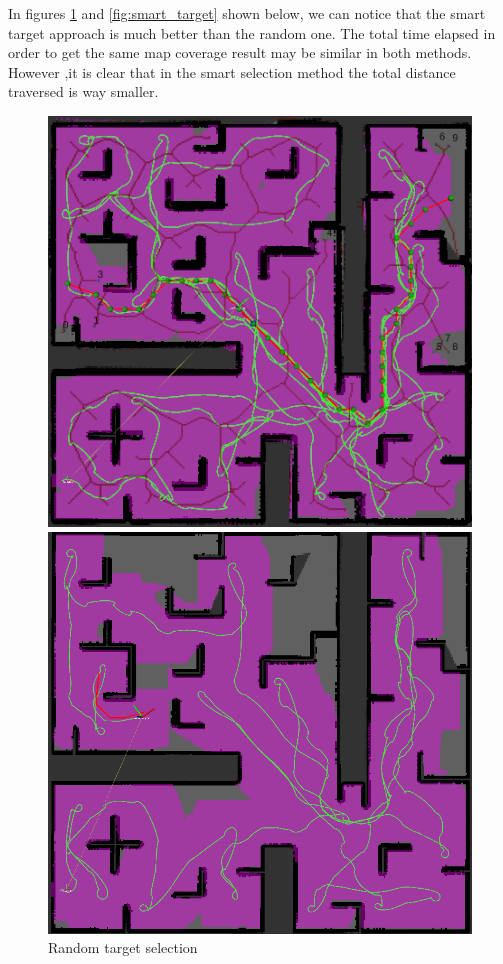 \documentclass[letterpaper,12pt]{article}
\begin{document}
In figures \ref{fig:random_target} and \ref{fig:smart_target} shown below, we can notice that the smart target approach is much better than the random one. The total time elapsed in order to get the same map coverage result may be similar in both methods. However ,it is clear that in the smart selection method the total distance traversed is way smaller.

\begin{figure}[!htb]
	\centering
	\begin{minipage}[b]{0.45\textwidth}
		\includegraphics[width=\textwidth]{images/random_target.png}
		\caption{Random target selection}
		\label{fig:random_target}
	\end{minipage}
	\hfill
	\begin{minipage}[b]{0.45\textwidth}
		\includegraphics[width=\textwidth]{images/smart_target.png}

\end{minipage}
\end{figure}
\end{document}
